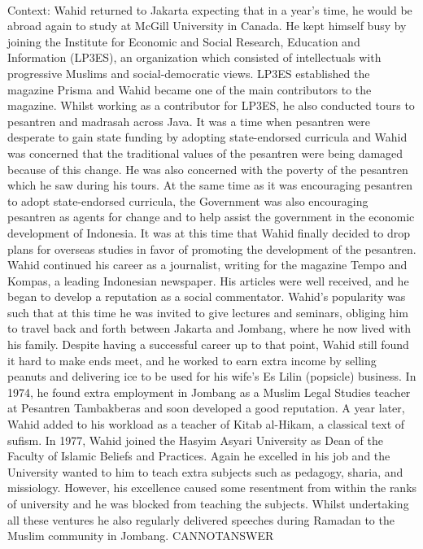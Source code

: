 \documentclass[11pt,a4paper, onecolumn]{article}
\begin{document}
\\ Context: Wahid returned to Jakarta expecting that in a year's time, he would be abroad again to study at McGill University in Canada. He kept himself busy by joining the Institute for Economic and Social Research, Education and Information (LP3ES), an organization which consisted of intellectuals with progressive Muslims and social-democratic views. LP3ES established the magazine Prisma and Wahid became one of the main contributors to the magazine. Whilst working as a contributor for LP3ES, he also conducted tours to pesantren and madrasah across Java. It was a time when pesantren were desperate to gain state funding by adopting state-endorsed curricula and Wahid was concerned that the traditional values of the pesantren were being damaged because of this change. He was also concerned with the poverty of the pesantren which he saw during his tours. At the same time as it was encouraging pesantren to adopt state-endorsed curricula, the Government was also encouraging pesantren as agents for change and to help assist the government in the economic development of Indonesia. It was at this time that Wahid finally decided to drop plans for overseas studies in favor of promoting the development of the pesantren. Wahid continued his career as a journalist, writing for the magazine Tempo and Kompas, a leading Indonesian newspaper. His articles were well received, and he began to develop a reputation as a social commentator. Wahid's popularity was such that at this time he was invited to give lectures and seminars, obliging him to travel back and forth between Jakarta and Jombang, where he now lived with his family. Despite having a successful career up to that point, Wahid still found it hard to make ends meet, and he worked to earn extra income by selling peanuts and delivering ice to be used for his wife's Es Lilin (popsicle) business. In 1974, he found extra employment in Jombang as a Muslim Legal Studies teacher at Pesantren Tambakberas and soon developed a good reputation. A year later, Wahid added to his workload as a teacher of Kitab al-Hikam, a classical text of sufism. In 1977, Wahid joined the Hasyim Asyari University as Dean of the Faculty of Islamic Beliefs and Practices. Again he excelled in his job and the University wanted to him to teach extra subjects such as pedagogy, sharia, and missiology. However, his excellence caused some resentment from within the ranks of university and he was blocked from teaching the subjects. Whilst undertaking all these ventures he also regularly delivered speeches during Ramadan to the Muslim community in Jombang. CANNOTANSWER
\end{document}
